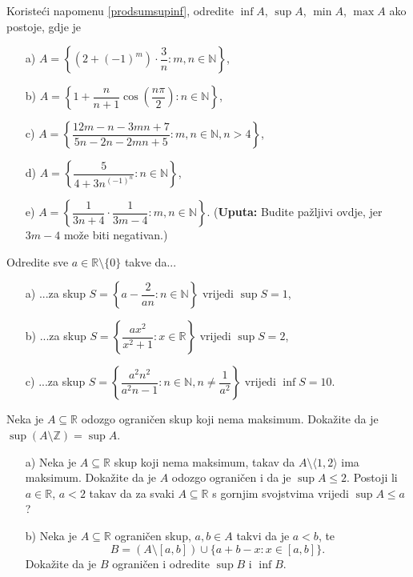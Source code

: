\begin{exercise}{\unskip} Koristeći napomenu \ref{prodsumsupinf}, odredite \(\inf{A}\), \(\sup{A}\), \(\min{A}\), \(\max{A}\) ako postoje, gdje je 
\begin{itemize}
\item[a)] \(A=\left\{(2+(-1)^m)\cdot \dfrac{3}{n} : m, n\in \mathbb{N}\right\}\),
\item[b)] \(A=\left\{1+\dfrac{n}{n+1}\cos\left(\dfrac{n\pi}{2}\right) : n\in \mathbb{N}\right\}\),
\item[c)] \(A=\left\{\dfrac{12m-n-3mn+7}{5n-2n-2mn+5} : m, n\in \mathbb{N}, n>4\right\}\),
\item[d)] \(A=\left\{\dfrac{5}{4+3n^{(-1)^n}} : n\in \mathbb{N}\right\}\),
\item[e)] \(A=\left\{\dfrac{1}{3n+4}\cdot \dfrac{1}{3m-4} : m, n\in \mathbb{N}\right\}\). (\textbf{Uputa:} Budite pažljivi ovdje, jer $3m-4$ može biti negativan.)
\end{itemize}
\end{exercise}
\begin{exercise}{\unskip} Odredite sve \(a\in \mathbb{R}\setminus\{0\}\) takve da...
\begin{itemize}
\item[a)] ...za skup \(S=\left\{a-\dfrac{2}{an} : n\in \mathbb{N}\right\}\) vrijedi \(\sup{S}=1\),
\item[b)] ...za skup \(S=\left\{\dfrac{ax^2}{x^2+1} : x\in \mathbb{R}\right\}\) vrijedi \(\sup{S}=2\),
\item[c)] ...za skup \(S=\left\{\dfrac{a^2n^2}{a^2n-1} : n\in \mathbb{N}, n\neq \dfrac{1}{a^2}\right\}\) vrijedi \(\inf{S}=10\).
\end{itemize}
\end{exercise}
\begin{exercise}{\unskip}
Neka je $A\subseteq \mathbb{R}$ odozgo ograničen skup koji nema maksimum. Dokažite da je $\sup{\left(A\setminus \mathbb{Z}\right)}=\sup{A}$.
\end{exercise}
\begin{exercise}{\unskip} \textbf{}
\begin{itemize}
\item[a)] Neka je \(A\subseteq \mathbb{R}\) skup koji nema maksimum, takav da \(A\setminus\langle 1, 2\rangle\) ima maksimum. Dokažite da je \(A\) odozgo ograničen i da je \(\sup{A}\leq 2\). Postoji li \(a\in \mathbb{R}\), \(a<2\) takav da za svaki \(A\subseteq \mathbb{R}\) s gornjim svojstvima vrijedi \(\sup{A}\leq a\)?

\item[b)] Neka je $A\subseteq \mathbb{R}$ ograničen skup, $a, b\in A$ takvi da je $a<b$, te $$B=\left(A\setminus [a, b]\right)\cup \{ a+b-x : x\in [a, b]\}.$$ Dokažite da je $B$ ograničen i odredite $\sup{B}$ i $\inf{B}$.
\end{itemize}
\end{exercise}
